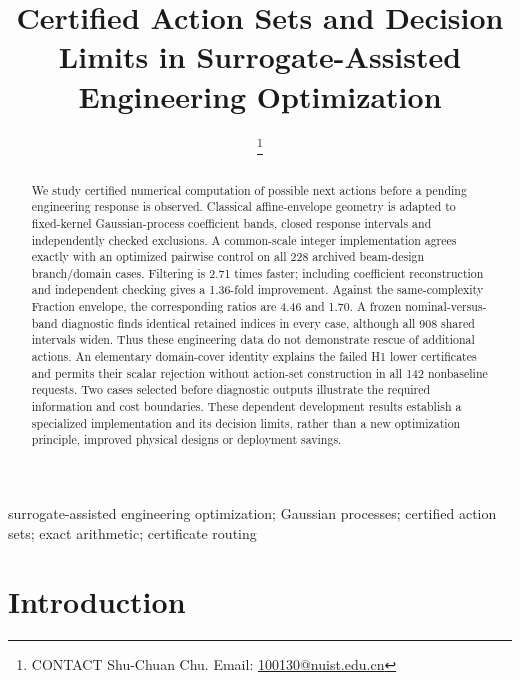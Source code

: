 \documentclass[]{interact}
\begin{document}
\title{Certified Action Sets and Decision Limits in Surrogate-Assisted Engineering Optimization}
\author{
\thanks{CONTACT Shu-Chuan Chu. Email: \href{mailto:100130@nuist.edu.cn}{100130@nuist.edu.cn}}
}
\maketitle
\begin{abstract}
We study certified numerical computation of possible next actions before a pending engineering response is observed. Classical affine-envelope geometry is adapted to fixed-kernel Gaussian-process coefficient bands, closed response intervals and independently checked exclusions. A common-scale integer implementation agrees exactly with an optimized pairwise control on all 228 archived beam-design branch/domain cases. Filtering is 2.71 times faster; including coefficient reconstruction and independent checking gives a 1.36-fold improvement. Against the same-complexity Fraction envelope, the corresponding ratios are 4.46 and 1.70. A frozen nominal-versus-band diagnostic finds identical retained indices in every case, although all 908 shared intervals widen. Thus these engineering data do not demonstrate rescue of additional actions. An elementary domain-cover identity explains the failed H1 lower certificates and permits their scalar rejection without action-set construction in all 142 nonbaseline requests. Two cases selected before diagnostic outputs illustrate the required information and cost boundaries. These dependent development results establish a specialized implementation and its decision limits, rather than a new optimization principle, improved physical designs or deployment savings.
\end{abstract}
\begin{keywords}
surrogate-assisted engineering optimization; Gaussian processes; certified action sets; exact arithmetic; certificate routing
\end{keywords}

\section{Introduction}
\end{document}
